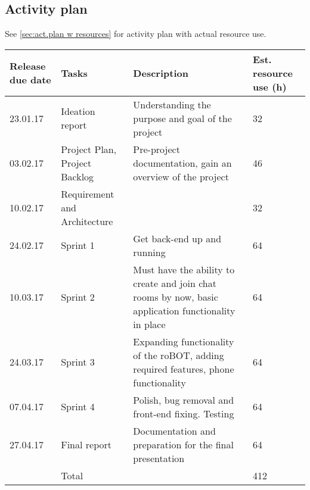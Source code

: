 \subsection{Activity plan}
See \cref{sec:act.plan w resources} for activity plan with actual resource use.

\begin{adjustbox}{center}
\begin{tabular}{ p{0.1\paperwidth} | p{0.1\paperwidth} | p{} | p{0.1\paperwidth} }
    Release due date 
    & Tasks 
    & Description
    & Est. \newline resource \newline use (h)
   \\ \hline
    23.01.17 
    & Ideation report
    & Understanding the purpose and goal of the project
    & 32
    \\ \hline
    03.02.17
    & Project Plan, Project Backlog
    & Pre-project documentation, gain an overview of the project
    & 46
    \\ \hline
    10.02.17
    & Requirement and Architecture
    & 
    & 32 
    \\ \hline
    24.02.17
    & Sprint 1
    & Get back-end up and running
    & 64 
    \\ \hline
    10.03.17
    & Sprint 2
    & Must have the ability to create and join chat rooms by now, basic application functionality in place
    & 64 
    \\ \hline
    24.03.17
    & Sprint 3
    & Expanding functionality of the roBOT, adding required features, phone functionality
    & 64
    \\ \hline
    07.04.17
    & Sprint 4
    & Polish, bug removal and front-end fixing. Testing
    & 64
    \\ \hline
    27.04.17
    & Final report
    & Documentation and preparation for the final presentation
    & 64
    \\ \hline
    & Total
    & 
    & 412
    
\end{tabular}
\end{adjustbox}

